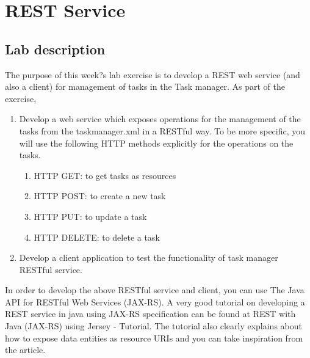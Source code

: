\chapter{REST Service}
\minitoc

\section{Lab description}
\label{rest_description}
The purpose of this week?s lab exercise is to develop a REST web service (and also a client) for management of tasks in the Task manager. As part of the exercise,
\begin{enumerate}
 \item Develop a web service which exposes operations  for the management of the tasks from the taskmanager.xml in a RESTful way. To be more specific, you will use the following HTTP methods explicitly for the operations on the tasks.\\
 \begin{enumerate}
     \item HTTP GET: to get tasks as resources
     \item HTTP POST: to create a new task
     \item HTTP PUT: to update a task
     \item HTTP DELETE: to delete a task
 \end{enumerate}
 \item Develop a client application to test the functionality of task manager RESTful service.
\end{enumerate}
In order to develop the above RESTful service and client, you can use The Java API for RESTful Web Services (JAX-RS).  A very good tutorial on developing a REST service in java using JAX-RS specification  can be found at REST with Java (JAX-RS) using Jersey - Tutorial. The tutorial also clearly explains about how to expose data entities as resource URIs and you can take inspiration from the article.

